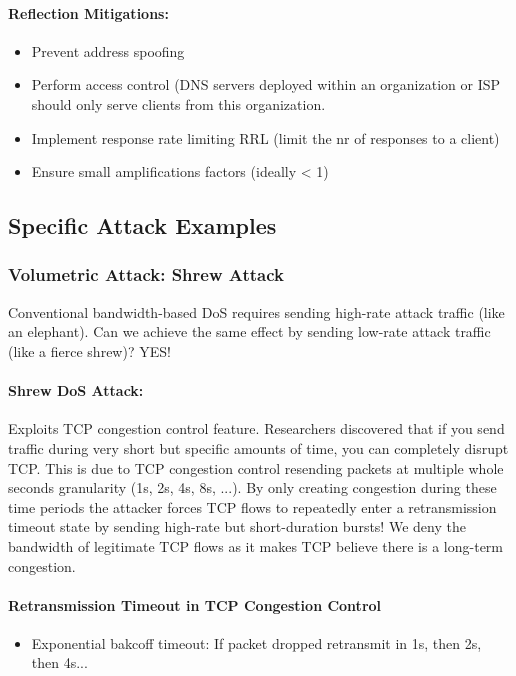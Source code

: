 \paragraph{Reflection Mitigations:}
\begin{itemize}
    \item Prevent address spoofing
    \item Perform access control (DNS servers deployed within an organization or ISP should only serve clients from this organization.
    \item Implement response rate limiting RRL (limit the nr of responses to a client)
    \item Ensure small amplifications factors (ideally < 1)
\end{itemize}


\subsection{Specific Attack Examples}

\subsubsection{Volumetric Attack: Shrew Attack}

Conventional bandwidth-based DoS requires sending high-rate attack traffic (like an elephant). Can we achieve the same effect by sending low-rate attack traffic (like a fierce shrew)? YES!\\

\paragraph{Shrew DoS Attack:} Exploits TCP congestion control feature. Researchers discovered that if you send traffic during very short but specific amounts of time, you can completely disrupt TCP. This is due to TCP congestion control resending packets at multiple whole seconds granularity (1s, 2s, 4s, 8s, ...). By only creating congestion during these time periods the attacker forces TCP flows to repeatedly enter a retransmission timeout state by sending high-rate but short-duration bursts! We deny the bandwidth of legitimate TCP flows as it makes TCP believe there is a long-term congestion.

\paragraph{Retransmission Timeout in TCP Congestion Control}
\begin{itemize}
    \item Exponential bakcoff timeout: If packet dropped retransmit in 1s, then 2s, then 4s...
\end{itemize}

